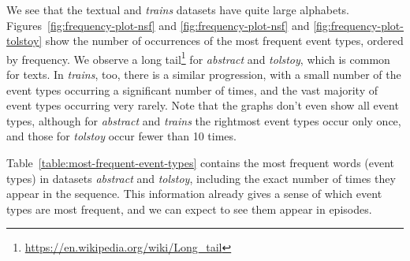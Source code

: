 We see that the textual and \emph{trains} datasets have quite large alphabets. Figures~\ref{fig:frequency-plot-nsf} and \ref{fig:frequency-plot-nsf} and \ref{fig:frequency-plot-tolstoy} show the number of occurrences of the most frequent event types, ordered by frequency. We observe a long tail\footnote{\url{https://en.wikipedia.org/wiki/Long_tail}} for \emph{abstract} and \emph{tolstoy}, which is common for texts. In \emph{trains}, too, there is a similar progression, with a small number of the event types occurring a significant number of times, and the vast majority of event types occurring very rarely. Note that the graphs don't even show all event types, although for \emph{abstract} and \emph{trains} the rightmost event types occur only once, and those for \emph{tolstoy} occur fewer than 10 times.

Table~\ref{table:most-frequent-event-types} contains the most frequent words (event types) in datasets \emph{abstract} and \emph{tolstoy}, including the exact number of times they appear in the sequence. This information already gives a sense of which event types are most frequent, and we can expect to see them appear in episodes.

